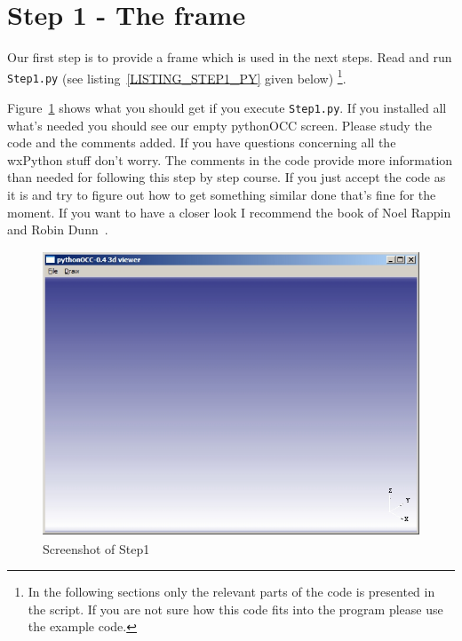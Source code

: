 \section{Step 1 - The frame}
Our first step is to provide a frame which is used in the next steps.
Read and run {\tt Step1.py} (see listing~\ref{LISTING_STEP1_PY} given below)
\footnote{In the following sections only the relevant parts of the code is presented in the script.
If you are not sure how this code fits into the program please use the example code.}.

Figure~\ref{STEP_1_SCREEN} shows what you should get if you execute {\tt Step1.py}.
If you installed all what's needed you should see our empty pythonOCC screen.
Please study the code and the comments added.
If you have questions concerning all the wxPython stuff don't worry.
The comments in the code provide more information than needed for following this step by step course.
If you just accept the code as it is and try to figure out how to get something similar done that's fine for the moment.
If you want to have a closer look I recommend the book of Noel Rappin and Robin Dunn~\cite{WXPYTHON_IN_ACTION}.
\begin{figure}[h]
\begin{center}
\includegraphics[height=8.5cm,width=11.3cm]{Step1.jpg}
\end{center}
\caption[Screenshot of Step1]{\label{STEP_1_SCREEN}Screenshot of Step1}
\end{figure}

